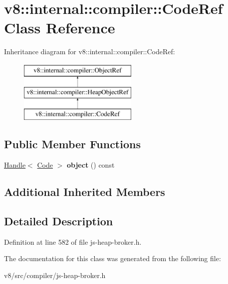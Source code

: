 \hypertarget{classv8_1_1internal_1_1compiler_1_1CodeRef}{}\section{v8\+:\+:internal\+:\+:compiler\+:\+:Code\+Ref Class Reference}
\label{classv8_1_1internal_1_1compiler_1_1CodeRef}
Inheritance diagram for v8\+:\+:internal\+:\+:compiler\+:\+:Code\+Ref\+:\begin{figure}[H]
\begin{center}
\leavevmode
\includegraphics[height=3.000000cm]{classv8_1_1internal_1_1compiler_1_1CodeRef}
\end{center}
\end{figure}
\subsection*{Public Member Functions}
\begin{DoxyCompactItemize}
\item 
\mbox{\label{classv8_1_1internal_1_1compiler_1_1CodeRef_ad1cad1f6d2e63fe2c23143c3f7285e64}} 
\mbox{\hyperlink{classv8_1_1internal_1_1Handle}{Handle}}$<$ \mbox{\hyperlink{classv8_1_1internal_1_1Code}{Code}} $>$ {\bfseries object} () const
\end{DoxyCompactItemize}
\subsection*{Additional Inherited Members}


\subsection{Detailed Description}


Definition at line 582 of file js-\/heap-\/broker.\+h.



The documentation for this class was generated from the following file\+:\begin{DoxyCompactItemize}
\item 
v8/src/compiler/js-\/heap-\/broker.\+h\end{DoxyCompactItemize}
